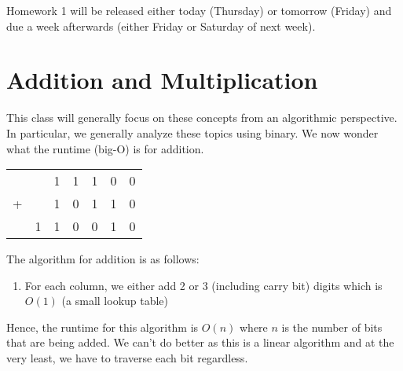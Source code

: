 \documentclass[14pt]{extarticle}
\begin{document}
	\MakeScribeTop

    Homework 1 will be released either today (Thursday) or tomorrow (Friday)
    and due a week afterwards (either Friday or Saturday of next week).

    \section{Addition and Multiplication}
    This class will generally focus on these concepts from an algorithmic 
    perspective. In particular, we generally analyze these topics using
    binary. We now wonder what the runtime (big-O) is for addition.\\
    \begin{center}
        \begin{tabular}{ccccccc}
          && 1 & 1 & 1 & 0 & 0 \\
         +&& 1 & 0 & 1 & 1 & 0\\
        \hline
          & 1 & 1 & 0 & 0 & 1 & 0
        \end{tabular}
    \end{center}
    The algorithm for addition is as follows:
    \begin{enumerate}
        \item For each column, we either add 2 or 3 (including carry bit)
            digits which is $O(1)$ (a small lookup table)
    \end{enumerate}
    Hence, the runtime for this algorithm is $O(n)$ where $n$ is the number
    of bits that are being added. We can't do better as this is a linear 
    algorithm and at the very least, we have to traverse each bit regardless.\\
\end{document}
